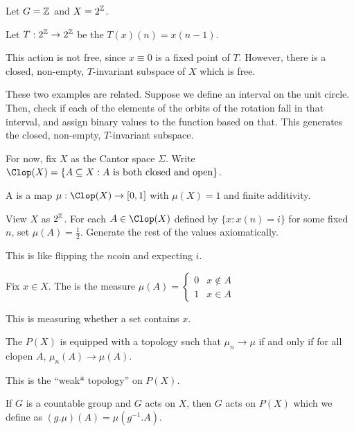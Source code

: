 \documentclass[class=pmath370,tikz,notes]{agony}
\begin{document}
\begin{example}
  Let $G = \mathbb{Z}$ and $X = 2^{\mathbb{Z}}$.

  Let $T : 2^{\mathbb{Z}} \to 2^{\mathbb{Z}}$ be the 
  $T(x)(n) = x(n-1)$.

  This action is not free, since $x \equiv 0$ is a fixed point of $T$.
  However, there is a closed, non-empty, $T$-invariant subspace of $X$
  which is free.
\end{example}

These two examples are related. Suppose we define an interval on the unit circle.
Then, check if each of the elements of the orbits of the rotation fall in that interval,
and assign binary values to the function based on that.
This generates the closed, non-empty, $T$-invariant subspace.

For now, fix $X$ as the Cantor space $\Sigma$.
Write $\Clop(X) = \{A \subseteq X : \text{$A$ is both closed and open}\}$.

\begin{defn}
  A  is a map $\mu : \Clop(X) \to [0,1]$
  with $\mu(X) = 1$ and finite additivity.
\end{defn}

\begin{example}
  View $X$ as $2^{\mathbb{Z}}$.
  For each $A \in \Clop(X)$ defined by $\{x : x(n) = i\}$ for some fixed $n$,
  set $\mu(A) = \frac12$.
  Generate the rest of the values axiomatically.
\end{example}

This is like flipping the $n$\xth coin and expecting $i$.

\begin{example}
  Fix $x \in X$. The  is the measure $\mu(A) = \begin{cases}
    0 & x \not\in A \\ 1 & x \in A
  \end{cases}$
\end{example}

This is measuring whether a set contains $x$.

\begin{defn}
  The  $P(X)$
  is equipped with a topology such that $\mu_n \to \mu$
  if and only if for all clopen $A$, $\mu_n(A) \to \mu(A)$.

  This is the ``weak* topology'' on $P(X)$.
\end{defn}

If $G$ is a countable group and $G$ acts on $X$,
then $G$ acts on $P(X)$ which we define as $(g.\mu)(A) = \mu(g^{-1}.A)$.
\end{document}

